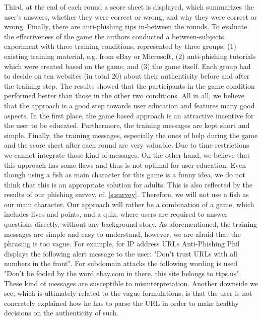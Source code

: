 Third, at the end of each round a score sheet is displayed, which summarizes the user's answers, whether they were correct or wrong, and why they were correct or wrong. 
Finally, there are anti-phishing tips in-between the rounds. \newline
To evaluate the effectiveness of the game the authors conducted a between-subjects experiment with three training conditions, represented by three groups: 
(1) existing training material, e.g. from eBay or Microsoft, (2) anti-phishing tutorials which were created based on the game, and (3) the game itself. 
Each group had to decide on ten websites (in total 20) about their authenticity before and after the training step. 
The results showed that the participants in the game condition performed better than those in the other two conditions. 
All in all, we believe that the approach is a good step towards user education and features many good aspects. 
In the first place, the game based approach is an attractive incentive for the user to be educated. 
Furthermore, the training messages are kept short and simple. 
Finally, the training messages, especially the ones of help during the game and the score sheet after each round are very valuable. 
Due to time restrictions we cannot integrate those kind of messages. \newline
On the other hand, we believe that this approach has some flaws and thus is not optimal for user education. 
Even though using a fish as main character for this game is a funny idea, we do not think that this is an appropriate solution for adults. 
This is also reflected by the results of our phishing survey, cf. \autoref{s:survey}. 
Therefore, we will not use a fish as our main character. 
Our approach will rather be a combination of a game, which includes lives and points, and a quiz, where users are required to answer questions directly, without any background story.
As aforementioned, the training messages are simple and easy to understand, however, we are afraid that the phrasing is too vague. 
For example, for IP address URLs Anti-Phishing Phil displays the following alert message to the user: 
"Don't trust URLs with all numbers in the front". 
For subdomain attacks the following wording is used "Don't be fooled by the word ebay.com in there, this site belongs to ttps.us". 
These kind of messages are susceptible to misinterpretation. 
Another downside we see, which is ultimately related to the vague formulations, is that the user is not concretely explained how he has to parse the URL in order to make healthy decisions on the authenticity of such. 
